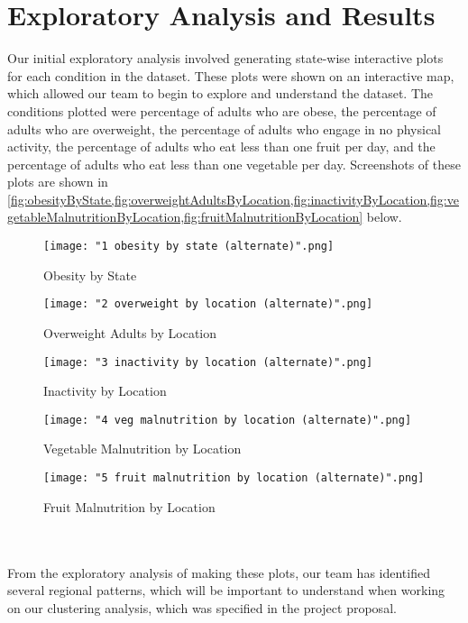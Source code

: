 \documentclass{article}
\begin{document}
	\section{Exploratory Analysis and Results}
		\label{results}
		Our initial exploratory analysis involved generating state-wise interactive plots for each condition in the dataset. These plots were shown on an interactive map, which allowed our team to begin to explore and understand the dataset. The conditions plotted were percentage of adults who are obese, the percentage of adults who are overweight, the percentage of adults who engage in no physical activity, the percentage of adults who eat less than one fruit per day, and the percentage of adults who eat less than one vegetable per day. Screenshots of these plots are shown in \cref{fig:obesityByState,fig:overweightAdultsByLocation,fig:inactivityByLocation,fig:vegetableMalnutritionByLocation,fig:fruitMalnutritionByLocation} below. 
		\begin{figure}[h]
			\centering
			\caption{Obesity by State}
			\texttt{[image: "1 obesity by state (alternate)".png]}
			\label{fig:obesityByState}
		\end{figure}
		\begin{figure}[h]
			\centering
			\caption{Overweight Adults by Location}
			\texttt{[image: "2 overweight by location (alternate)".png]}
			\label{fig:overweightAdultsByLocation}
		\end{figure}
		\begin{figure}[h]
			\centering
			\caption{Inactivity by Location}
			\texttt{[image: "3 inactivity by location (alternate)".png]}
			\label{fig:inactivityByLocation}
		\end{figure}
		\begin{figure}[h]
			\centering
			\caption{Vegetable Malnutrition by Location}
			\texttt{[image: "4 veg malnutrition by location (alternate)".png]}
			\label{fig:vegetableMalnutritionByLocation}
		\end{figure}
		\begin{figure}[h]
			\centering
			\caption{Fruit Malnutrition by Location}
			\texttt{[image: "5 fruit malnutrition by location (alternate)".png]}
			\label{fig:fruitMalnutritionByLocation}
		\end{figure}
		\\\\
		From the exploratory analysis of making these plots, our team has identified several regional patterns, which will be important to understand when working on our clustering analysis, which was specified in the project proposal.
\end{document}
